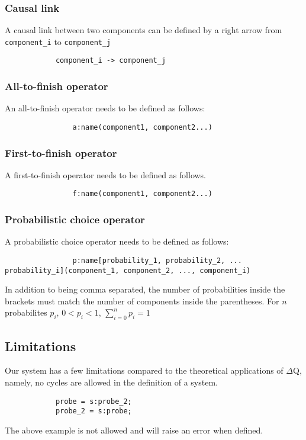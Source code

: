         \subsubsection{Causal link}
            A causal link between two components can be defined by a right arrow from \texttt{component\_i} to \texttt{component\_j}
        \begin{verbatim}
            component_i -> component_j 
        \end{verbatim}
        
        \subsubsection{All-to-finish operator}
            An all-to-finish operator needs to be defined as follows:
            \begin{verbatim}
                a:name(component1, component2...)
            \end{verbatim}

        \subsubsection{First-to-finish operator}
            A first-to-finish operator needs to be defined as follows.
            \begin{verbatim}
                f:name(component1, component2...)
            \end{verbatim} 

        \subsubsection{Probabilistic choice operator}
            A probabilistic choice operator needs to be defined as follows:
            \begin{verbatim}
                p:name[probability_1, probability_2, ... probability_i](component_1, component_2, ..., component_i) 
            \end{verbatim}
            In addition to being comma separated, the number of probabilities inside the brackets must match the number of components inside the parentheses. For $n$ probabilites $p_i$, $0 < p_i < 1$, $\sum_{i = 0}^{n} p_i = 1$ 
        \subsection{Limitations}
            Our system has a few limitations compared to the theoretical applications of $\Delta$Q, namely, no cycles are allowed in the definition of a system.
        \begin{verbatim}
            probe = s:probe_2;
            probe_2 = s:probe;
        \end{verbatim}
        The above example is not allowed and will raise an error when defined. 
